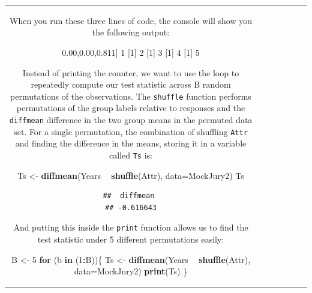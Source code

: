 \documentclass[]{book}
\newenvironment{Shaded}{\begin{snugshade}}{\end{snugshade}}
\newcommand{\KeywordTok}[1]{\textcolor[rgb]{0.13,0.29,0.53}{\textbf{#1}}}
\newcommand{\DataTypeTok}[1]{\textcolor[rgb]{0.13,0.29,0.53}{#1}}
\newcommand{\DecValTok}[1]{\textcolor[rgb]{0.00,0.00,0.81}{#1}}
\newcommand{\StringTok}[1]{\textcolor[rgb]{0.31,0.60,0.02}{#1}}
\newcommand{\ControlFlowTok}[1]{\textcolor[rgb]{0.13,0.29,0.53}{\textbf{#1}}}
\newcommand{\OperatorTok}[1]{\textcolor[rgb]{0.81,0.36,0.00}{\textbf{#1}}}
\newcommand{\NormalTok}[1]{#1}
\theoremstyle{definition}
\theoremstyle{definition}
\theoremstyle{remark}
\begin{document}
\begin{longtable}[]{@{}ccccccc@{}}
\begin{minipage}[b]{0.10\columnwidth}
When you run these three lines of code, the console will show you the
following output:

\begin{Shaded}
\begin{Highlighting}[]
\NormalTok{[}\DecValTok{1}\NormalTok{] }\DecValTok{1}
\NormalTok{[}\DecValTok{1}\NormalTok{] }\DecValTok{2}
\NormalTok{[}\DecValTok{1}\NormalTok{] }\DecValTok{3}
\NormalTok{[}\DecValTok{1}\NormalTok{] }\DecValTok{4}
\NormalTok{[}\DecValTok{1}\NormalTok{] }\DecValTok{5}
\end{Highlighting}
\end{Shaded}

Instead of printing the counter, we want to use the loop to repeatedly
compute our test statistic across B random permutations of the
observations. The \texttt{shuffle} function performs permutations of the
group labels relative to responses and the \texttt{diffmean} difference
in the two group means in the permuted data set. For a single
permutation, the combination of shuffling \texttt{Attr} and finding the
difference in the means, storing it in a variable called \texttt{Ts} is:

\begin{Shaded}
\begin{Highlighting}[]
\NormalTok{Ts <-}\StringTok{ }\KeywordTok{diffmean}\NormalTok{(Years }\OperatorTok{~}\StringTok{ }\KeywordTok{shuffle}\NormalTok{(Attr), }\DataTypeTok{data=}\NormalTok{MockJury2)}
\NormalTok{Ts}
\end{Highlighting}
\end{Shaded}

\begin{verbatim}
##  diffmean 
## -0.616643
\end{verbatim}

And putting this inside the \texttt{print} function allows us to find
the test statistic under 5 different permutations easily:

\begin{Shaded}
\begin{Highlighting}[]
\NormalTok{B <-}\StringTok{ }\DecValTok{5}
\ControlFlowTok{for}\NormalTok{ (b }\ControlFlowTok{in}\NormalTok{ (}\DecValTok{1}\OperatorTok{:}\NormalTok{B))\{}
\NormalTok{  Ts <-}\StringTok{ }\KeywordTok{diffmean}\NormalTok{(Years }\OperatorTok{~}\StringTok{ }\KeywordTok{shuffle}\NormalTok{(Attr), }\DataTypeTok{data=}\NormalTok{MockJury2)}
  \KeywordTok{print}\NormalTok{(Ts)}
\NormalTok{\}}
\end{Highlighting}
\end{Shaded}


\end{minipage}
\end{longtable}
\end{document}
